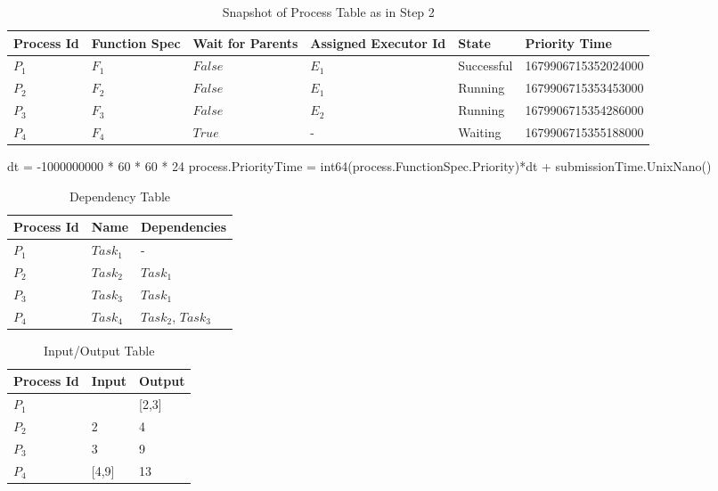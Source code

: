 \documentclass{article}
\begin{document}
\begin{table}[h]
	\caption{Snapshot of Process Table as in Step 2}
	\centering
	\begin{tabular}{llllll}
		\toprule
		\cmidrule(r){1-2}
        Process Id & Function Spec & Wait for Parents & Assigned Executor Id & State      & Priority Time \\
		\midrule
        $P_{1}$    & $F_{1}$       & $False$          & $E_{1}$              & Successful & 1679906715352024000 \\
        $P_{2}$    & $F_{2}$       & $False$          & $E_{1}$              & Running    & 1679906715353453000 \\
        $P_{3}$    & $F_{3}$       & $False$          & $E_{2}$              & Running    & 1679906715354286000 \\
        $P_{4}$    & $F_{4}$       & $True$           & -                    & Waiting    & 1679906715355188000 \\
		\bottomrule
	\end{tabular}
	\label{tab:table}
\end{table}

dt = -1000000000 * 60 * 60 * 24
process.PriorityTime = int64(process.FunctionSpec.Priority)*dt + submissionTime.UnixNano()


\begin{table}[h]
	\caption{Dependency Table}
	\centering
	\begin{tabular}{lll}
		\toprule
		\cmidrule(r){1-2}
        Process Id & Name       & Dependencies           \\
		\midrule
        $P_{1}$    & $Task_{1}$ & -                      \\
        $P_{2}$    & $Task_{2}$ & $Task_{1}$             \\
        $P_{3}$    & $Task_{3}$ & $Task_{1}$             \\
        $P_{4}$    & $Task_{4}$ & $Task_{2}$, $Task_{3}$ \\
		\bottomrule
	\end{tabular}
	\label{tab:table}
\end{table}
	
\begin{table}[h]
	\caption{Input/Output Table}
	\centering
	\begin{tabular}{lll}
		\toprule
		\cmidrule(r){1-2}
        Process Id & Input & Output \\
		\midrule
        $P_{1}$    & & [2,3] \\
        $P_{2}$    & 2 & 4 \\
        $P_{3}$    & 3 & 9 \\
        $P_{4}$    & [4,9] & 13 \\
		\bottomrule
	\end{tabular}
	\label{tab:table}
\end{table}
\end{document}
